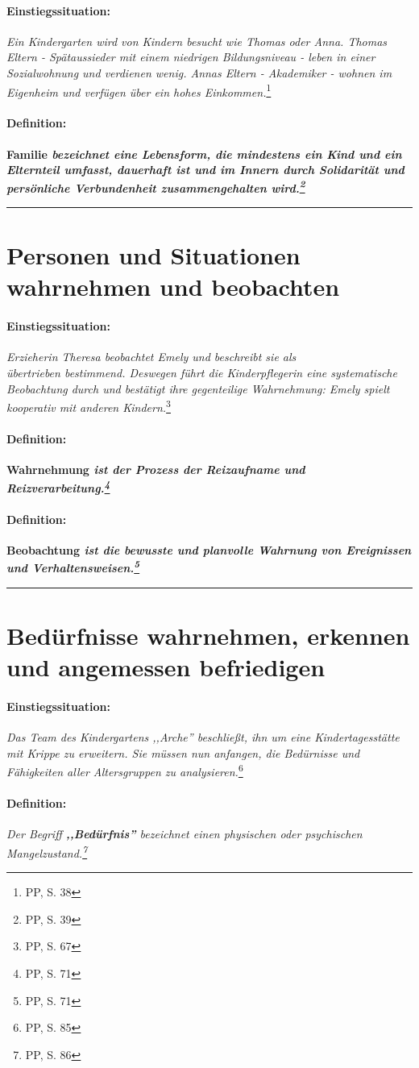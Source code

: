 \documentclass[12pt,a4paper]{article}
\newcommand\einstieg{\paragraph{\color{amethyst} {Einstiegssituation:}}}
\newcommand\definition{\paragraph{\color{red} {Definition:}}}
\begin{document}
\einstieg {\sl Ein Kindergarten wird von Kindern besucht wie Thomas oder Anna.
  Thomas Eltern - Spätaussieder mit einem niedrigen Bildungsniveau - leben in
  einer Sozialwohnung und verdienen wenig. Annas Eltern - Akademiker - wohnen
  im Eigenheim und verfügen über ein hohes Einkommen.}\footnote{\label{F-Anna} PP, S. 38}

\definition \bf{Familie} \sl{bezeichnet eine Lebensform, die
  mindestens ein Kind und ein Elternteil umfasst, dauerhaft ist und im Innern
  durch Solidarität und persönliche Verbundenheit zusammengehalten
  wird.}\footnote{\label{Familie} PP, S. 39}

\vskip 16pt \hrule
{ \color{coolblack}
  \section{Personen und Situationen wahrnehmen und beobachten} }

\einstieg {\sl Erzieherin Theresa beobachtet Emely und
  beschreibt sie als \\ übertrieben
  bestimmend. Deswegen führt die Kinderpflegerin
  eine systematische Beobachtung durch und bestätigt ihre gegenteilige
  Wahrnehmung: Emely spielt kooperativ mit anderen Kindern.}\footnote{\label{F-Emily} PP, S. 67}

\definition \bf{Wahrnehmung} \sl{ist der Prozess der
  Reizaufname und Reizverarbeitung.}\footnote{\label{Wahrnehmung} PP, S. 71}

\definition \bf{Beobachtung} \sl{ist die bewusste und
  planvolle Wahrnung von Ereignissen und Verhaltensweisen.}\footnote{\label{Beobachtung} PP, S. 71}

\vskip 16pt \hrule
{ \color{coolblack}
  \section{Bedürfnisse wahrnehmen, erkennen und angemessen befriedigen} }

\einstieg {\sl Das Team des Kindergartens ,,Arche'' beschließt, ihn um eine
  Kindertagesstätte mit Krippe zu erweitern. Sie müssen nun anfangen, die Bedürnisse
  und Fähigkeiten aller Altersgruppen zu analysieren.}\footnote{\label{F-Arche} PP, S. 85}

\definition \sl{Der Begriff} {\bf ,,Bedürfnis''} \sl{bezeichnet
  einen physischen oder psychischen Mangelzustand.}\footnote{\label{Bedürfnis} PP, S. 86}
\end{document}
